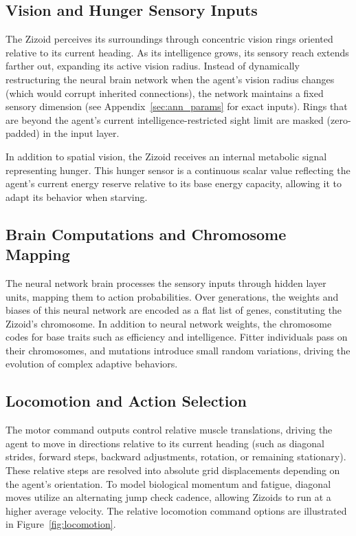 \documentclass[11pt,a4paper]{article}
\begin{document}
\subsection{Vision and Hunger Sensory Inputs}
The Zizoid perceives its surroundings through concentric vision rings oriented relative to its current heading. As its intelligence grows, its sensory reach extends farther out, expanding its active vision radius. Instead of dynamically restructuring the neural brain network when the agent's vision radius changes (which would corrupt inherited connections), the network maintains a fixed sensory dimension (see Appendix~\ref{sec:ann_params} for exact inputs). Rings that are beyond the agent's current intelligence-restricted sight limit are masked (zero-padded) in the input layer.

In addition to spatial vision, the Zizoid receives an internal metabolic signal representing hunger. This hunger sensor is a continuous scalar value reflecting the agent's current energy reserve relative to its base energy capacity, allowing it to adapt its behavior when starving.

\subsection{Brain Computations and Chromosome Mapping}
The neural network brain processes the sensory inputs through hidden layer units, mapping them to action probabilities. Over generations, the weights and biases of this neural network are encoded as a flat list of genes, constituting the Zizoid's chromosome. In addition to neural network weights, the chromosome codes for base traits such as efficiency and intelligence. Fitter individuals pass on their chromosomes, and mutations introduce small random variations, driving the evolution of complex adaptive behaviors.

\subsection{Locomotion and Action Selection}
The motor command outputs control relative muscle translations, driving the agent to move in directions relative to its current heading (such as diagonal strides, forward steps, backward adjustments, rotation, or remaining stationary). These relative steps are resolved into absolute grid displacements depending on the agent's orientation. To model biological momentum and fatigue, diagonal moves utilize an alternating jump check cadence, allowing Zizoids to run at a higher average velocity. The relative locomotion command options are illustrated in Figure~\ref{fig:locomotion}.
\end{document}

